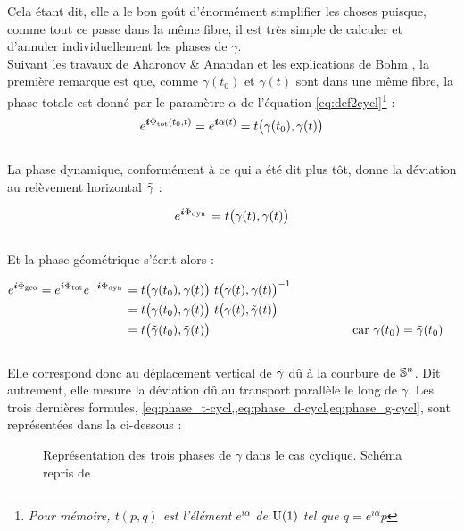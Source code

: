 Cela étant dit, elle a le bon goût d'énormément simplifier les choses puisque, comme tout ce passe dans la même fibre, il est très simple de calculer et d'annuler individuellement les phases de $\gamma$. 
\\
Suivant les travaux de Aharonov \& Anandan \cite{aharonov_phase_1987} et les explications de Bohm \cite{bohm_geometric_2003}, la première remarque est que, comme $\gamma(t_0)$ et $\gamma(t)$ sont dans une même fibre, la phase totale est donné par le paramètre $\alpha$ de l'équation \eqref{eq:def2cycl}\footnote{\itshape 
Pour mémoire, $t(p,q)$ est l'élément $e^{i\alpha}$ de $\U{1}$ tel que $q = e^{i\alpha}p$} :
\begin{equation}\label{eq:phase_t-cycl}
e^{\i \phaset(t_0,t)} = e^{\i \alpha(t)} = t\big( \gamma(t_0), \gamma(t) \big)
\end{equation}
\\
La phase dynamique, conformément à ce qui a été dit plus tôt, donne la déviation au relèvement horizontal $\Tilde{\gamma}$ :\par
\begin{equation}\label{eq:phase_d-cycl}
e^{\i \phased}= t\big( \Tilde{\gamma}(t), \gamma(t) \big)
\end{equation}
\\
Et la phase géométrique s'écrit alors :\par
\begin{equation}\label{eq:phase_g-cycl}
\begin{aligned}
	e^{\i \phaseg}= e^{\i \phaset} e^{-\i \phased} &= t\big( \gamma(t_0), \gamma(t) \big)\ t\big( \Tilde{\gamma}(t), \gamma(t) \big)^{-1} \\
	&= t\big( \gamma(t_0), \gamma(t) \big)\ t\big( \gamma(t), \Tilde{\gamma}(t) \big) \\
	&= t\big( \Tilde{\gamma}(t_0), \Tilde{\gamma}(t) \big)  &  
	&&  &&  &&  && \text{car }\gamma(t_0) &= \Tilde{\gamma}(t_0)
\end{aligned}
\end{equation}
\\
Elle correspond donc au déplacement vertical de $\Tilde{\gamma}$ dû à la courbure de $\S{n}$. Dit autrement, elle mesure la déviation dû au transport parallèle le long de $\gamma$. Les trois dernières formules, \cref{eq:phase_t-cycl,,eq:phase_d-cycl,eq:phase_g-cycl}, sont représentées dans la  ci-dessous : 
\\

\begin{figure}[h]

\caption[\DONE Représentation des trois phases de $\gamma$ dans le cas pseudo-cyclique]{Représentation des trois phases de $\gamma$ dans le cas cyclique. Schéma repris de \cite[fig. 4.1]{bohm_geometric_2003}}
\label{fig:phases-cycl}
\end{figure}

